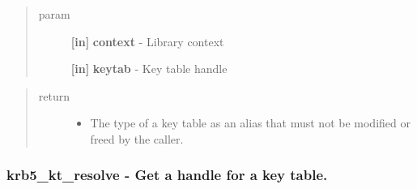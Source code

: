 \documentclass[letterpaper,10pt,english]{sphinxmanual}
\begin{document}
\begin{quote}\begin{description}
\item[{param}] \leavevmode
\textbf{{[}in{]}} \textbf{context} - Library context

\textbf{{[}in{]}} \textbf{keytab} - Key table handle

\end{description}\end{quote}
\begin{quote}\begin{description}
\item[{return}] \leavevmode\begin{itemize}
\item {} 
The type of a key table as an alias that must not be modified or freed by the caller.

\end{itemize}

\end{description}\end{quote}


\subsubsection{krb5\_kt\_resolve -  Get a handle for a key table.}
\label{appdev/refs/api/krb5_kt_resolve:krb5-kt-resolve-get-a-handle-for-a-key-table}\label{appdev/refs/api/krb5_kt_resolve::doc}

\begin{fulllineitems}
\label{appdev/refs/api/krb5_kt_resolve:krb5_kt_resolve}
\end{fulllineitems}
\end{document}
